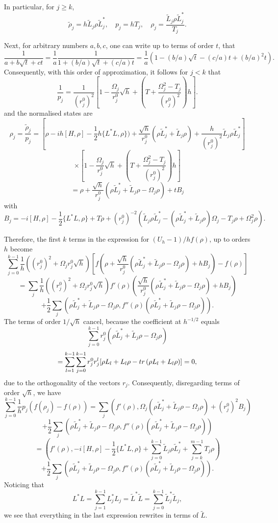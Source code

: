 \documentclass[10pt,a4paper]{amsart}
\def\tr{\rm{tr}}
\newcommand{\Om}{\Omega}
\begin{document}
In particular, for $j\ge k$,
\[
\tilde \rho_j =h\tilde L_j \rho \tilde L_j^*, \quad p_j=hT_j, \quad \rho_j=\frac{\tilde L_j \rho \tilde L_j^*}{T_j}.
\]

Next, for arbitrary numbers $a,b,c$, one can write up to terms of order $t$, that
\[
\frac{1}{a+b\sqrt t +ct}
=\frac{1}{a} \frac{1}{1+(b/a) \sqrt t+(c/a) t}
=\frac{1}{a}(1-(b/a) \sqrt t-(c/a) t+(b/a)^2 t).
\]
Consequently, with this order of approximation, it follows for $j<k$ that
\[
\frac{1}{p_j}=\frac{1}{(r_j^0)^2}
\left[1- \frac{\Om_j}{r^0_j} \sqrt h  +\left(T+\frac{\Om_j^2-T_j}{(r^0_j)^2}\right)h \right].
\]
and the normalised states are
\[
\rho_j=\frac{\tilde \rho_j}{p_j}=[\rho -ih[H, \rho] -\frac12 h\{L^*L,\rho\})
+\frac{\sqrt h}{r^0_j} (\rho \tilde L_j^*+\tilde L_j \rho)+\frac{h}{(r^0_j)^2}\tilde L_j \rho \tilde L_j^*]
\]
\[
\times \left[1- \frac{\Om_j}{r^0_j} \sqrt h  +\left(T+\frac{\Om_j^2-T_j}{(r^0_j)^2}\right)h \right]
\]
\[
=\rho +  \frac{\sqrt h}{r^0_j}  (\rho \tilde L_j^* + \tilde L_j\rho-\Om_j \rho)+tB_j
\]
with
\[
B_j=-i[H, \rho] -\frac12 \{L^*L,\rho\}+ T \rho
 +(r_j^0)^{-2} (\tilde L_j\rho \tilde L_j^*-(\rho \tilde L_j^* + \tilde L_j\rho) \Om_j -T_j\rho +\Om_j^2  \rho).
\]

Therefore, the first $k$ terms in the expression for $(U_h-1)/h f(\rho)$, up to orders $h$ become
\[
\sum_{j=0}^{k-1} \frac{1}{h} ((r_j^0)^2 +\Om_j r^0_j \sqrt h)
[f(\rho +  \frac{\sqrt h}{r^0_j}  (\rho \tilde L_j^* + \tilde L_j\rho-\Om_j \rho)+hB_j)-f(\rho)]
\]
\[
=\sum_j  \frac{1}{h} ((r_j^0)^2 +\Om_j r^0_j \sqrt h)
f'(\rho) \left(\frac{\sqrt h}{r^0_j}  (\rho \tilde L_j^* + \tilde L_j\rho-\Om_j \rho)+hB_j\right)
\]
\[
+\frac12 \sum_j  \left(\rho \tilde L_j^* + \tilde L_j\rho-\Om_j \rho,
f''(\rho)  (\rho \tilde L_j^* + \tilde L_j\rho-\Om_j \rho)\right).
\]
The terms of order $1/\sqrt h$ cancel, because the coefficient at $h^{-1/2}$ equals
\[
\sum_{j=0}^{k-1} r_j^0   (\rho \tilde L_j^* + \tilde L_j\rho-\Om_j \rho)
\]
\[
=\sum_{l=1}^{k-1} \sum_{j=0}^{k-1} r^0_j r^l_j [\rho L_l +L_l \rho -{\tr}\, (\rho L_l+L_l \rho)]=0,
\]
due to the orthogonality of the vectors $r_j$. Consequently, disregarding terms of order $\sqrt h$, we have
\[
\sum_{j=0}^{k-1} \frac{1}{h} p_j (f(\rho_j)-f(\rho))
=\sum_j \left(f'(\rho), \Om_j  (\rho \tilde L_j^* + \tilde L_j\rho-\Om_j \rho)+(r^0_j)^2B_j\right)
\]
\[
+\frac12 \sum_j  \left(\rho \tilde L_j^* + \tilde L_j\rho-\Om_j \rho,
f''(\rho)  (\rho \tilde L_j^* + \tilde L_j\rho-\Om_j \rho)\right)
\]
\[
=\left(f'(\rho), -i[H, \rho] -\frac12 \{L^*L,\rho\} +\sum_{j=0}^{k-1}\tilde L_j \rho \tilde L_j^*
+\sum_{j=k}^{m-1} T_j \rho \right)
\]
\[
+\frac12 \sum_j  \left(\rho \tilde L_j^* + \tilde L_j\rho-\Om_j \rho,
f''(\rho)  (\rho \tilde L_j^* + \tilde L_j\rho-\Om_j \rho)\right).
\]
Noticing that
\[
L^*L=\sum_{j=1}^{k-1} L_j^*L_j=\tilde L^* \tilde L=\sum_{j=0}^{k-1}\tilde L_j^* \tilde L_j,
\]
we see that everything in the last expression rewrites in terms of $\tilde L$.
\end{document}
